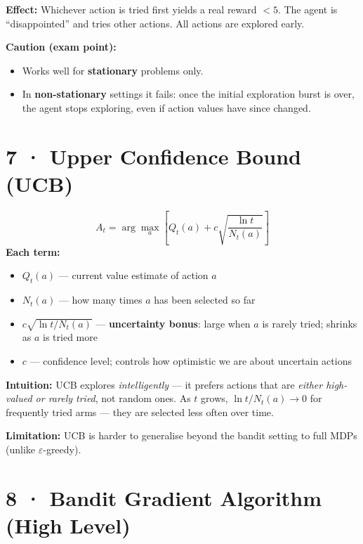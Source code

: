 \documentclass[11pt,a4paper]{article}
\begin{document}
\textbf{Effect:} Whichever action is tried first yields a real reward $< 5$.
The agent is ``disappointed'' and tries other actions. All actions are explored early.

\textbf{Caution (exam point):}
\begin{itemize}
  \item Works well for \textbf{stationary} problems only.
  \item In \textbf{non-stationary} settings it fails: once the initial exploration burst is over,
    the agent stops exploring, even if action values have since changed.
\end{itemize}

\section*{7 · Upper Confidence Bound (UCB)}

\begin{tcolorbox}[defn={UCB Action Selection}]
\[
  A_t = \arg\max_a \left[ Q_t(a) + c\sqrt{\frac{\ln t}{N_t(a)}} \right]
\]
\textbf{Each term:}
\begin{itemize}
  \item $Q_t(a)$ — current value estimate of action $a$
  \item $N_t(a)$ — how many times $a$ has been selected so far
  \item $c\sqrt{\ln t / N_t(a)}$ — \textbf{uncertainty bonus}: large when $a$ is rarely tried; shrinks as $a$ is tried more
  \item $c$ — confidence level; controls how optimistic we are about uncertain actions
\end{itemize}
\end{tcolorbox}

\textbf{Intuition:} UCB explores \emph{intelligently} — it prefers actions that are
\emph{either high-valued or rarely tried}, not random ones.
As $t$ grows, $\ln t / N_t(a) \to 0$ for frequently tried arms — they are selected less often over time.

\textbf{Limitation:} UCB is harder to generalise beyond the bandit setting to full MDPs (unlike $\varepsilon$-greedy).

\section*{8 · Bandit Gradient Algorithm (High Level)}
\end{document}
